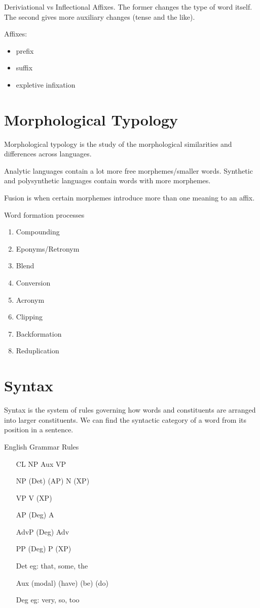 \documentclass[12pt]{article}
\begin{document}
Deriviational vs Inflectional Affixes. The former changes the type of word itself. The second gives more auxiliary changes (tense and the like).

Affixes:
\begin{itemize}
\item prefix
\item suffix
\item expletive infixation
\end{itemize}

\section{Morphological Typology}

Morphological typology is the study of the morphological similarities and differences across languages.

Analytic languages contain a lot more free morphemes/smaller words. Synthetic and polysynthetic languages contain words with more morphemes.

Fusion is when certain morphemes introduce more than one meaning to an affix.

Word formation processes
\begin{enumerate}
\item Compounding
\item Eponyms/Retronym
\item Blend
\item Conversion
\item Acronym
\item Clipping
\item Backformation
\item Reduplication
\end{enumerate}

\section{Syntax}

Syntax is the system of rules governing how words and constituents are arranged into larger constituents. We can find the syntactic category of a word from its position in a sentence.

English Grammar Rules

\begin{itemize}
\item[CL] NP Aux VP
\item[NP] (Det) (AP) N (XP)
\item[VP] V (XP)
\item[AP] (Deg) A
\item[AdvP] (Deg) Adv
\item[PP] (Deg) P (XP)
\item[Det] eg: that, some, the
\item[Aux] (modal) (have) (be) (do)
\item[Deg] eg: very, so, too
\end{itemize}
\end{document}
